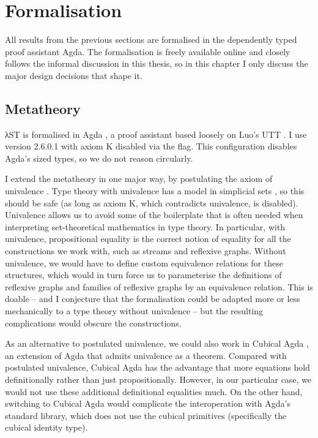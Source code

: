 \chapter{Formalisation}
\label{sec:formalisation}

All results from the previous sections are formalised in the dependently typed
proof assistant Agda. The formalisation is freely available online
\cite{limperg2019code} and closely follows the informal discussion in this
thesis, so in this chapter I only discuss the major design decisions that shape
it.


\section{Metatheory}
\label{sec:formalisation:metatheory}

λST is formalised in Agda \cite{norellphd}, a proof assistant based loosely on
Luo's UTT \cite{luo1992}. I use version 2.6.0.1 with axiom K disabled via the
 flag. This configuration disables Agda's sized types, so we
do not reason circularly.

I extend the metatheory in one major way, by postulating the axiom of univalence
\cite{hottbook}. Type theory with univalence has a model in simplicial sets
\cite{kapulkin2012}, so this should be safe (as long as axiom K, which
contradicts univalence, is disabled). Univalence allows us to avoid some of the
boilerplate that is often needed when interpreting set-theoretical mathematics
in type theory. In particular, with univalence, propositional equality is the
correct notion of equality for all the constructions we work with, such as
streams and reflexive graphs. Without univalence, we would have to define custom
equivalence relations for these structures, which would in turn force us to
parameterise the definitions of reflexive graphs and families of reflexive
graphs by an equivalence relation. This is doable -- and I conjecture that the
formalisation could be adapted more or less mechanically to a type theory
without univalence -- but the resulting complications would obscure the
constructions.

As an alternative to postulated univalence, we could also work in Cubical Agda
\cite{vezzosi2019}, an extension of Agda that admits univalence as a theorem.
Compared with postulated univalence, Cubical Agda has the advantage that more
equations hold definitionally rather than just propositionally. However, in our
particular case, we would not use these additional definitional equalities much.
On the other hand, switching to Cubical Agda would complicate the interoperation
with Agda's standard library, which does not use the cubical primitives
(specifically the cubical identity type).

